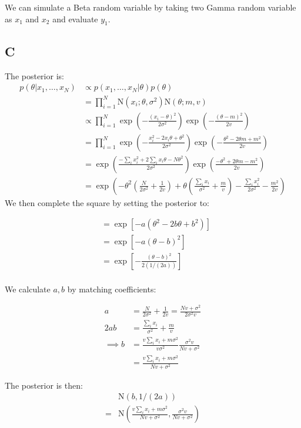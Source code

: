\documentclass{article}
\begin{document}
We can simulate a Beta random variable by taking two Gamma random variable as \(x_1\) and \(x_2\) and evaluate \(y_1\).

\subsection*{C}
The posterior is:
\begin{align*}
p(\theta| x_1, \ldots, x_N) &\propto p(x_1, \ldots, x_N | \theta) p(\theta)\\
&=\prod_{i=1}^N \mbox{N}(x_i; \theta, \sigma^2) \mbox{N}(\theta; m, v)\\
&\propto \prod_{i=1}^N \exp\left( -\frac{(x_i-\theta)^2}{2\sigma^2} \right) \exp\left( -\frac{(\theta - m)^2}{2v} \right)\\
&= \prod_{i=1}^N\exp\left(- \frac{x_i^2-2x_i\theta + \theta^2}{2\sigma^2} \right) \exp\left( -\frac{\theta^2 - 2\theta m + m^2}{2v} \right)\\
&=\exp\left( \frac{-\sum_i x_i^2+2\sum_i x_i\theta - N\theta^2}{2\sigma^2} \right) \exp\left( \frac{-\theta^2 + 2\theta m - m^2}{2v} \right)\\
&= \exp \left( -\theta^2\left(\frac{N}{2\sigma^2} + \frac{1}{2v} \right) + \theta\left(\frac{\sum_ix_i}{\sigma^2} + \frac{m}{v}\right) - \frac{\sum_ix_i^2}{2\sigma^2} - \frac{m^2}{2v} \right)
\end{align*}
We then complete the square by setting the posterior to:

\begin{align*}
&=\exp \left[ -a\left(\theta^2 -2b\theta + b^2\right) \right]\\
&=\exp \left[ -a\left(\theta - b\right)^2 \right]\\
&=\exp \left[ -\frac{(\theta - b)^2}{2(1/(2a))} \right]\\
\end{align*}


We calculate \(a, b\) by matching coefficients:

\begin{align*}
a &= \frac{N}{2\sigma^2} + \frac{1}{2v} = \frac{Nv + \sigma^2}{2\sigma^2v}\\
2ab &= \frac{\sum_ix_i}{\sigma^2} + \frac{m}{v}\\
\implies b &= \frac{v\sum_ix_i + m\sigma^2}{v\sigma^2} \frac{\sigma^2v}{Nv + \sigma^2}\\
&=\frac{v\sum_ix_i + m\sigma^2}{Nv + \sigma^2}
\end{align*}

The posterior is then:
\begin{align*}
&\mbox{N}(b, 1/(2a))\\
=&\mbox{N}\left(\frac{v\sum_ix_i + m\sigma^2}{Nv + \sigma^2}, \frac{\sigma^2v}{Nv + \sigma^2} \right)
\end{align*}
\end{document}
